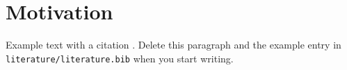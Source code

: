 \chapter{Motivation}

Example text with a citation \cite{example_book}. Delete this paragraph and the example entry in \texttt{literature/literature.bib} when you start writing.

